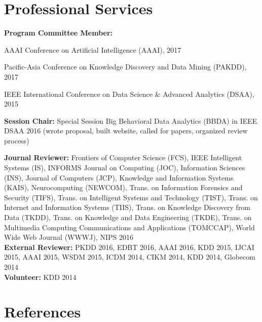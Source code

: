\documentclass[margin, 10pt]{res}
\begin{document}
\begin{resume}

\section{Professional Services}

\textbf{Program Committee Member:}
\begin{compactitem}
\item AAAI Conference on Artificial Intelligence (AAAI), 2017
\item Pacific-Asia Conference on Knowledge Discovery and Data Mining (PAKDD), 2017
\item IEEE International Conference on Data Science \& Advanced Analytics (DSAA), 2015
\end{compactitem}

\textbf{Session Chair:}
Special Session Big Behavioral Data Analytics (BBDA) in IEEE DSAA 2016
(wrote proposal, built website, called for papers, organized review process)

\textbf{Journal Reviewer:}
Frontiers of Computer Science (FCS),
IEEE Intelligent Systems (IS),
INFORMS Journal on Computing (JOC),
Information Sciences (INS),
Journal of Computers (JCP),
Knowledge and Information Systems (KAIS),
Neurocomputing (NEWCOM),
Trans. on Information Forensics and Security (TIFS),
Trans. on Intelligent Systems and Technology (TIST),
Trans. on Internet and Information Systems (TIIS),
Trans. on Knowledge Discovery from Data (TKDD),
Trans. on Knowledge and Data Engineering (TKDE),
Trans. on Multimedia Computing Communications and Applications (TOMCCAP),
World Wide Web Journal (WWWJ), NIPS 2016 \\
\textbf{External Reviewer:} PKDD 2016, EDBT 2016, AAAI 2016, KDD 2015, IJCAI 2015, AAAI 2015,
WSDM 2015, ICDM 2014, CIKM 2014, KDD 2014, Globecom 2014 \\
\textbf{Volunteer:} KDD 2014


\section{References}


\end{resume}
\end{document}
